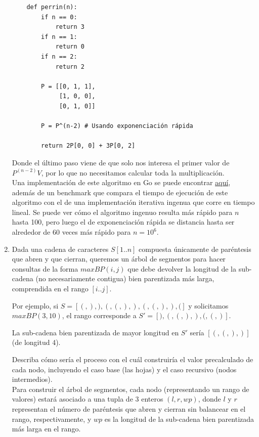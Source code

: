\documentclass[letterpaper, 12pt]{article}
\begin{document}
\begin{enumerate}
\begin{verbatim}
    def perrin(n):
        if n == 0:
            return 3
        if n == 1:
            return 0
        if n == 2:
            return 2

        P = [[0, 1, 1],
             [1, 0, 0],
             [0, 1, 0]]

        P = P^(n-2) # Usando exponenciación rápida

        return 2P[0, 0] + 3P[0, 2]
\end{verbatim}

Donde el último paso viene de que solo nos interesa el primer valor de $P^{(n-2)}V$, por lo que no necesitamos calcular toda la multiplicación. \\

Una implementación de este algoritmo en Go se puede encontrar \href{}{aquí}, además de un benchmark que compara el tiempo de ejecución de este algoritmo con el de una implementación iterativa ingenua que corre en tiempo lineal. Se puede ver cómo el algoritmo ingenuo resulta más rápido para $n$ hasta 100, pero luego el de exponenciación rápida se distancia hasta ser alrededor de 60 veces más rápido para $n=10^6$.


\item Dada una cadena de caracteres $S[1..n]$ compuesta únicamente de paréntesis que abren y que cierran, queremos un árbol de segmentos para hacer consultas de la forma $maxBP(i, j)$ que debe devolver la longitud de la sub-cadena (no necesariamente contigua) bien parentizada más larga, comprendida en el rango $[i..j]$.

Por ejemplo, si $S = [(, ), ), (, (, ), ), (, (, ), ), (]$ y solicitamos $maxBP(3, 10)$, el rango corresponde a $S' = [), (, (, ), ), (, (, )]$.

La sub-cadena bien parentizada de mayor longitud en $S'$ sería $[(, (, ), )]$ (de longitud 4).

Describa cómo sería el proceso con el cuál construiría el valor precalculado de cada nodo, incluyendo el caso base (las hojas) y el caso recursivo (nodos intermedios). \\

Para construir el árbol de segmentos, cada nodo (representando un rango de valores) estará asociado a una tupla de 3 enteros $(l, r, wp)$, donde $l$ y $r$ representan el número de paréntesis que abren y cierran sin balancear en el rango, respectivamente, y $wp$ es la longitud de la sub-cadena bien parentizada más larga en el rango.


\end{enumerate}
\end{document}
